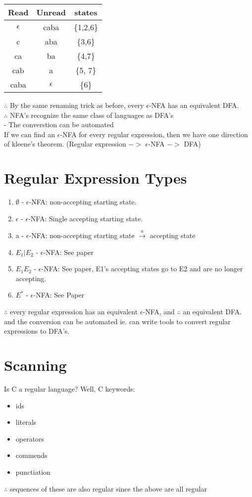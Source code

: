 \documentclass[12pt]{article}
\begin{document}
	\begin{tabular}{c | c | c}
		Read & Unread & states \\ \hline
		$\epsilon$ & caba & \{1,2,6\} \\
		c & aba & \{3,6\} \\
		ca & ba & \{4,7\} \\
		cab & a & \{5, 7\} \\
		caba & $\epsilon$ & \{6\} \\
	\end{tabular}
	
	$\therefore$ By the same renaming trick as before, every $\epsilon$-NFA has an equivalent DFA.\\
	$\therefore$ NFA's recognize the same class of languages as DFA's\\
	- The converstion can be automated\\
	
	If we can find an $\epsilon$-NFA for every regular expression, then we have one direction of kleene's theorem. (Regular expression $->$ $\epsilon$-NFA $->$ DFA)\\
	
	\section*{Regular Expression Types}
	\begin{enumerate}
		\item $\emptyset$ - $\epsilon$-NFA: non-accepting starting state.
		\item $\epsilon$ - $\epsilon$-NFA: Single accepting starting state.
		\item a - $\epsilon$-NFA: non-accepting starting state $\overset{a}{\rightarrow}$ accepting state
		\item $E_1|E_2$ - $\epsilon$-NFA: See paper
		\item $E_1E_2$ - $\epsilon$-NFA: See paper, E1's accepting states go to E2 and are no longer accepting.
		\item $E^*$ - $\epsilon$-NFA: See Paper
	\end{enumerate}
	
	$\therefore$ every regular expression has an equivalent $\epsilon$-NFA, and $\therefore$ an equivalent DFA. and the conversion can be automated ie. can write tools to convert regular expressions to DFA's.\\
	
	\section*{Scanning}
	Is C a regular language? Well,
	C keywords:
	\begin{itemize}
		\item ids
		\item literals
		\item operators
		\item commends
		\item punctiation
	\end{itemize}
	$\therefore$ sequences of these are also regular since the above are all regular\\
	
\end{document}
